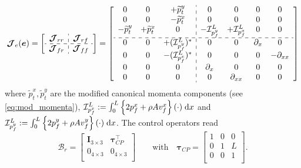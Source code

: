 \documentclass{svjour3}                     %
\begin{document}
\begin{equation}
\label{eq:EB_J}
\bm{\mathcal{J}}_{e}(\bm{e}) = 
\left[ \begin{array}{c:c}
\bm{\mathcal{J}}_{rr} & \bm{\mathcal{J}}_{rf} \\
\hdashline
\bm{\mathcal{J}}_{fr} & \bm{\mathcal{J}}_{ff} \\
\end{array} \right] = 
\left[ \begin{array}{ccc:cccc}
0 & 0 & +\widetilde{p}_t^y      & 0 & 0 & 0 & 0 \\
0 & 0 & -\widetilde{p}_t^x     & 0 & 0 & 0 & 0 \\
-\widetilde{p}_t^y & +\widetilde{p}_t^x & 0 & -\mathcal{I}_{p_f^y}^{L} & +\mathcal{I}_{p_f^x}^{L} & 0 & 0 \\
\hdashline 
0 & 0 & +(\mathcal{I}_{p_f^y}^{L})^* & 0 & 0 & \partial_x & 0  \\
0 & 0 & -(\mathcal{I}_{p_f^x}^{L})^* & 0 & 0 & 0 & -\partial_{xx} \\
0 & 0 & 0 & \partial_{x} & 0 & 0 & 0 \\
0 & 0 & 0 & 0 & \partial_{xx} & 0 & 0 \\
\end{array} \right]
\end{equation}
where $\widetilde{p}_t^x, \widetilde{p}_t^y$ are the modified canonical momenta components (see \eqref{eq:mod_momenta}), $\mathcal{I}_{p_f^x}^{L} := \int_{0}^{L} \left\{2 p_f^x + \rho A v_f^x \right\} (\cdot) \d{x}$ and $\mathcal{I}_{p_f^y}^{L} := \int_{0}^{L} \left\{2 p_f^y + \rho A v_f^y \right\} (\cdot) \d{x}$. The control operators read
\begin{equation}
\bm{\mathcal{B}}_r = \begin{bmatrix}
\bm{I}_{3\times 3} & \bm\tau_{CP}^\top \\
0_{4\times 3} & 0_{4\times 3} \\
\end{bmatrix} \qquad \text{with} \quad
\bm\tau_{CP} = \begin{bmatrix}
1 & 0 & 0 \\
0 & 1 & L \\
0 & 0 & 1 \\
\end{bmatrix}.
\end{equation}
\end{document}

